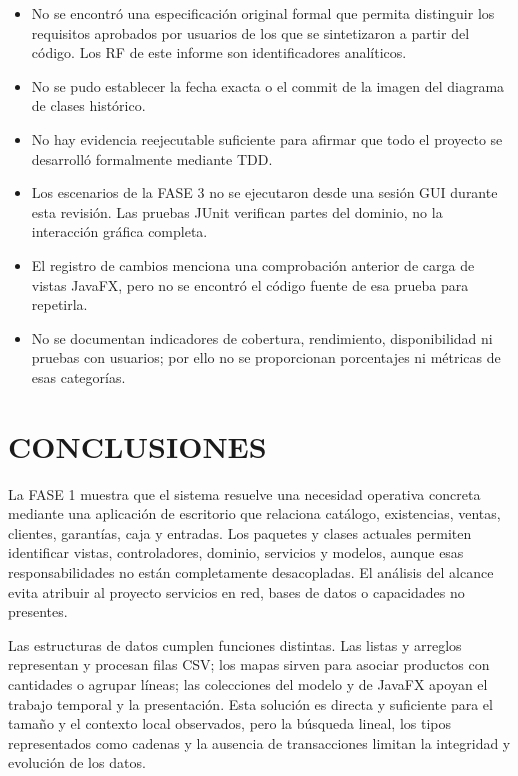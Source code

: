 \begin{itemize}
    \item No se encontró una especificación original formal que permita distinguir los requisitos aprobados por usuarios de los que se sintetizaron a partir del código. Los RF de este informe son identificadores analíticos.
    \item No se pudo establecer la fecha exacta o el commit de la imagen del diagrama de clases histórico.
    \item No hay evidencia reejecutable suficiente para afirmar que todo el proyecto se desarrolló formalmente mediante TDD.
    \item Los escenarios de la FASE 3 no se ejecutaron desde una sesión GUI durante esta revisión. Las pruebas JUnit verifican partes del dominio, no la interacción gráfica completa.
    \item El registro de cambios menciona una comprobación anterior de carga de vistas JavaFX, pero no se encontró el código fuente de esa prueba para repetirla.
    \item No se documentan indicadores de cobertura, rendimiento, disponibilidad ni pruebas con usuarios; por ello no se proporcionan porcentajes ni métricas de esas categorías.
\end{itemize}

\section*{CONCLUSIONES}

La FASE 1 muestra que el sistema resuelve una necesidad operativa concreta mediante una aplicación de escritorio que relaciona catálogo, existencias, ventas, clientes, garantías, caja y entradas. Los paquetes y clases actuales permiten identificar vistas, controladores, dominio, servicios y modelos, aunque esas responsabilidades no están completamente desacopladas. El análisis del alcance evita atribuir al proyecto servicios en red, bases de datos o capacidades no presentes.

Las estructuras de datos cumplen funciones distintas. Las listas y arreglos representan y procesan filas CSV; los mapas sirven para asociar productos con cantidades o agrupar líneas; las colecciones del modelo y de JavaFX apoyan el trabajo temporal y la presentación. Esta solución es directa y suficiente para el tamaño y el contexto local observados, pero la búsqueda lineal, los tipos representados como cadenas y la ausencia de transacciones limitan la integridad y evolución de los datos.


